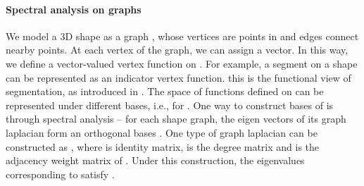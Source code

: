 \documentclass[10pt,twocolumn,letterpaper]{article}
\newcommand{\mypara}{\vspace*{-15pt}\paragraph}
\begin{document}
\mypara{Spectral analysis on graphs}
We model a 3D shape  as a graph , whose vertices  are points in  and edges  connect nearby points. At each vertex of the graph, we can assign a vector. In this way, we define a vector-valued vertex function on . For example, a segment on a shape can be represented as an indicator vertex function. this is the functional view of segmentation, as introduced in \cite{wang2013image,wang2014unsupervised}. The space of functions  defined on  can be represented under different bases, i.e.,  for . One way to construct bases of  is through spectral analysis -- for each shape graph, the eigen vectors of its graph laplacian  form an orthogonal bases . One type of graph laplacian can be constructed as , where  is identity matrix,  is the degree matrix and  is the adjacency weight matrix of . Under this construction, the eigenvalues  corresponding to  satisfy .
\end{document}
